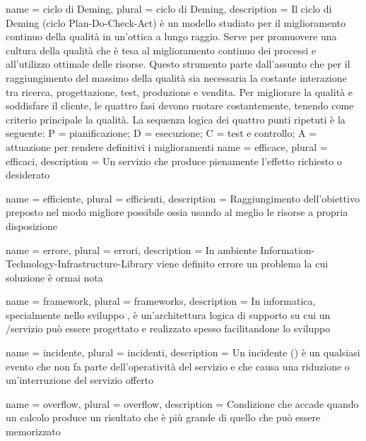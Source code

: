 %
%
{
	name		= {ciclo di Deming},
	plural		= {ciclo di Deming},
	description = {Il ciclo di Deming (ciclo \acf{Plan-Do-Check-Act}) è un modello studiato per il miglioramento continuo della qualità in un'ottica a lungo raggio. Serve per promuovere una cultura della qualità che è tesa al miglioramento continuo dei processi e all'utilizzo ottimale delle risorse. Questo strumento parte dall'assunto che per il raggiungimento del massimo della qualità sia necessaria la costante interazione tra ricerca, progettazione, test, produzione e vendita. Per migliorare la qualità e soddisfare il cliente, le quattro fasi devono ruotare costantemente, tenendo come criterio principale la qualità. La sequenza logica dei quattro punti ripetuti è la seguente: P = pianificazione; D = esecuzione; C = test e controllo; A = attuazione per rendere definitivi i miglioramenti}
}
{
	name		= {efficace},
	plural		= {efficaci},
	description = {Un servizio che produce pienamente l'effetto richiesto o desiderato}
}

{
	name		= {efficiente},
	plural		= {efficienti},
	description = {Raggiungimento dell'obiettivo preposto nel modo migliore possibile ossia usando al meglio le risorse a propria disposizione}
}

{
	name		= {errore},
	plural		= {errori},
	description = {In ambiente \ac{Information-Technology-Infrastructure-Library} viene definito errore un problema la cui soluzione è ormai nota}
}

{
	name		= {framework},
	plural		= {frameworks},
	description = {In informatica, specialmente nello sviluppo , è un'architettura logica di supporto su cui un /servizio può essere progettato e realizzato spesso facilitandone lo sviluppo}
}

{
	name		= {incidente},
	plural		= {incidenti},
	description	= {Un incidente () è un qualsiasi evento che non fa parte dell'operatività  del servizio e che causa una riduzione o un'interruzione del servizio offerto}
}

{
	name		= {overflow},
	plural		= {overflow},
	description = {Condizione che accade quando un calcolo produce un risultato che è più grande di quello che può essere memorizzato}
}

